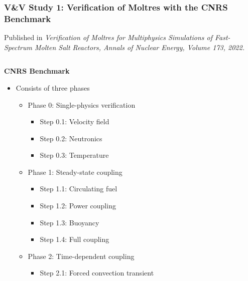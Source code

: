 \begin{frame}
  \frametitle{V\&V Study 1: Verification of Moltres with the CNRS Benchmark}

  Published in \textit{Verification of Moltres for Multiphysics Simulations of Fast-Spectrum Molten
    Salt Reactors, Annals of Nuclear Energy, Volume 173, 2022.}

  \begin{columns}
    \column[t]{6.5cm}
    \begin{block}{\textbf{CNRS Benchmark \cite{tiberga_results_2020}}}
      \begin{itemize}
        \item Consists of three phases
          \begin{itemize}
            \item Phase 0: Single-physics verification
              \begin{itemize}
                \item Step 0.1: Velocity field
                \item Step 0.2: Neutronics
                \item Step 0.3: Temperature
              \end{itemize}
            \item Phase 1: Steady-state coupling
              \begin{itemize}
                \item Step 1.1: Circulating fuel
                \item Step 1.2: Power coupling
                \item Step 1.3: Buoyancy
                \item Step 1.4: Full coupling
              \end{itemize}
            \item Phase 2: Time-dependent coupling
              \begin{itemize}
                \item Step 2.1: Forced convection transient
              \end{itemize}
          \end{itemize}
      \end{itemize}
    \end{block}
    \column[t]{3.5cm}
    \begin{figure}
      \centering

\end{figure}
\end{columns}
\end{frame}
